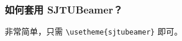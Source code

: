 \begin{frame}
  \frametitle{如何套用 SJTUBeamer？}

  非常简单，只需 \texttt{\textbackslash{}usetheme\{sjtubeamer\}} 即可。

\end{frame}
